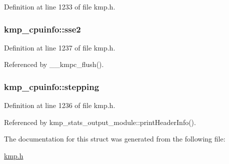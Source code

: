 Definition at line 1233 of file kmp.\-h.

\hypertarget{structkmp__cpuinfo_a06952924c8236563056c13d3158c70dc}{
\subsubsection[{sse2}]{ kmp\-\_\-cpuinfo\-::sse2}}\label{structkmp__cpuinfo_a06952924c8236563056c13d3158c70dc}


Definition at line 1237 of file kmp.\-h.



Referenced by \-\_\-\-\_\-kmpc\-\_\-flush().

\hypertarget{structkmp__cpuinfo_af2dd9e7cd2b55c588f9f7bc8d152dd41}{
\subsubsection[{stepping}]{ kmp\-\_\-cpuinfo\-::stepping}}\label{structkmp__cpuinfo_af2dd9e7cd2b55c588f9f7bc8d152dd41}


Definition at line 1236 of file kmp.\-h.



Referenced by kmp\-\_\-stats\-\_\-output\-\_\-module\-::print\-Header\-Info().



The documentation for this struct was generated from the following file\-:\begin{DoxyCompactItemize}
\item 
\hyperlink{kmp_8h}{kmp.\-h}\end{DoxyCompactItemize}
